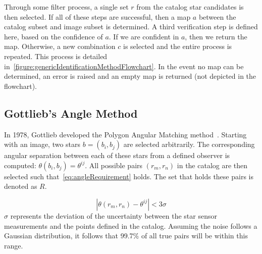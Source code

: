 Through some filter process, a single set $r$ from the catalog star candidates is then selected.
If all of these steps are successful, then a map $a$ between the catalog subset and image subset is determined.
A third verification step is defined here, based on the confidence of $a$.
If we are confident in $a$, then we return the map.
Otherwise, a new combination $c$ is selected and the entire process is repeated.
This process is detailed in~\autoref{figure:genericIdentificationMethodFlowchart}.
In the event no map can be determined, an error is raised and an empty map is returned (not depicted in the flowchart).


\subsection{Gottlieb's Angle Method}\label{subsec:gottlieb'sAngleMethod}
In 1978, Gottlieb developed the Polygon Angular Matching method~\cite{Angle,AnalysisUncompensated}.
Starting with an image, two stars $b = (b_i, b_j)$ are selected arbitrarily.
The corresponding angular separation between each of these stars from a defined observer is computed:
$\theta (b_i, b_j) = \theta^{ij}$.
All possible pairs $(r_m, r_n)$ in the catalog are then selected such that~\autoref{eq:angleRequirement} holds.
The set that holds these pairs is denoted as $R$.

\begin{equation}
    \label{eq:angleRequirement}
    \left\lvert  \theta(r_m, r_n) - \theta^{ij} \right\rvert < 3 \sigma
\end{equation}
$\sigma$ represents the deviation of the uncertainty between the star sensor measurements and the points defined in the
catalog.
Assuming the noise follows a Gaussian distribution, it follows that 99.7\% of all true pairs will be within this range.

